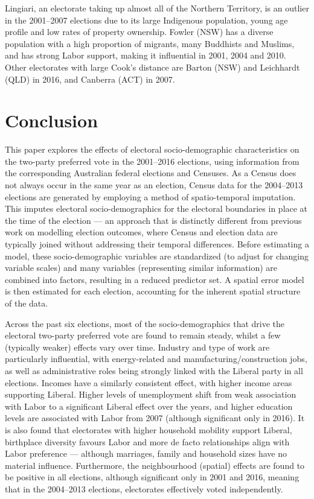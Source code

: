 \documentclass[11pt,a4paper,]{article}
\begin{document}
Lingiari, an electorate taking up almost all of the Northern Territory, is an outlier in the 2001--2007 elections due to its large Indigenous population, young age profile and low rates of property ownership. Fowler (NSW) has a diverse population with a high proportion of migrants, many Buddhists and Muslims, and has strong Labor support, making it influential in 2001, 2004 and 2010. Other electorates with large Cook's distance are Barton (NSW) and Leichhardt (QLD) in 2016, and Canberra (ACT) in 2007.

\hypertarget{conclusion}{%
\section{Conclusion}\label{conclusion}}

This paper explores the effects of electoral socio-demographic characteristics on the two-party preferred vote in the 2001--2016 elections, using information from the corresponding Australian federal elections and Censuses. As a Census does not always occur in the same year as an election, Census data for the 2004--2013 elections are generated by employing a method of spatio-temporal imputation. This imputes electoral socio-demographics for the electoral boundaries in place at the time of the election --- an approach that is distinctly different from previous work on modelling election outcomes, where Census and election data are typically joined without addressing their temporal differences. Before estimating a model, these socio-demographic variables are standardized (to adjust for changing variable scales) and many variables (representing similar information) are combined into factors, resulting in a reduced predictor set. A spatial error model is then estimated for each election, accounting for the inherent spatial structure of the data.

Across the past six elections, most of the socio-demographics that drive the electoral two-party preferred vote are found to remain steady, whilst a few (typically weaker) effects vary over time. Industry and type of work are particularly influential, with energy-related and manufacturing/construction jobs, as well as administrative roles being strongly linked with the Liberal party in all elections. Incomes have a similarly consistent effect, with higher income areas supporting Liberal. Higher levels of unemployment shift from weak association with Labor to a significant Liberal effect over the years, and higher education levels are associated with Labor from 2007 (although significant only in 2016). It is also found that electorates with higher household mobility support Liberal, birthplace diversity favours Labor and more de facto relationships align with Labor preference --- although marriages, family and household sizes have no material influence. Furthermore, the neighbourhood (spatial) effects are found to be positive in all elections, although significant only in 2001 and 2016, meaning that in the 2004--2013 elections, electorates effectively voted independently.
\end{document}
